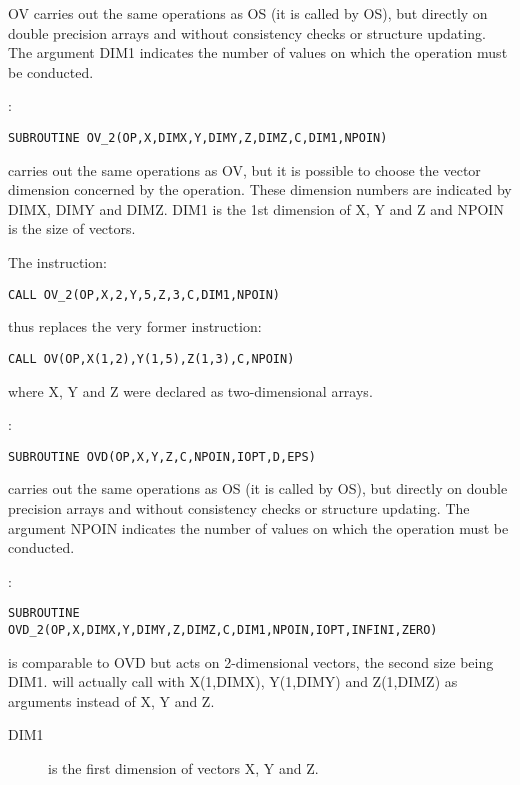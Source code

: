 OV carries out the same operations as OS (it is called by OS), but directly on
double precision arrays and without consistency checks or structure updating.
The argument DIM1 indicates the number of values on which the operation must
be conducted.

:
\begin{lstlisting}[language=TelFortran]
SUBROUTINE OV_2(OP,X,DIMX,Y,DIMY,Z,DIMZ,C,DIM1,NPOIN)
\end{lstlisting}

 carries out the same operations as OV, but it is possible to choose the
vector dimension concerned by the operation. These dimension numbers are
indicated by DIMX, DIMY and DIMZ.
DIM1 is the 1st dimension of X, Y and Z and NPOIN is the size of vectors.

The instruction:

\begin{lstlisting}[language=TelFortran]
CALL OV_2(OP,X,2,Y,5,Z,3,C,DIM1,NPOIN)
\end{lstlisting}
thus replaces the very former instruction:

\begin{lstlisting}[language=TelFortran]
CALL OV(OP,X(1,2),Y(1,5),Z(1,3),C,NPOIN)
\end{lstlisting}

where X, Y and Z were declared as two-dimensional arrays.

:
\begin{lstlisting}[language=TelFortran]
SUBROUTINE OVD(OP,X,Y,Z,C,NPOIN,IOPT,D,EPS)
\end{lstlisting}

 carries out the same operations as OS (it is called by OS), but directly on
double precision arrays and without consistency checks or structure updating.
The argument NPOIN indicates the number of values on which the operation must
be conducted.

:
\begin{lstlisting}[language=TelFortran]
SUBROUTINE OVD_2(OP,X,DIMX,Y,DIMY,Z,DIMZ,C,DIM1,NPOIN,IOPT,INFINI,ZERO)
\end{lstlisting}

 is comparable to OVD but acts on 2-dimensional vectors, the
second size being DIM1.  will actually call  with
X(1,DIMX), Y(1,DIMY) and Z(1,DIMZ) as arguments instead of X, Y and Z.

\begin{description}
  \item [DIM1] is the first dimension of vectors X, Y and Z.
\end{description}

